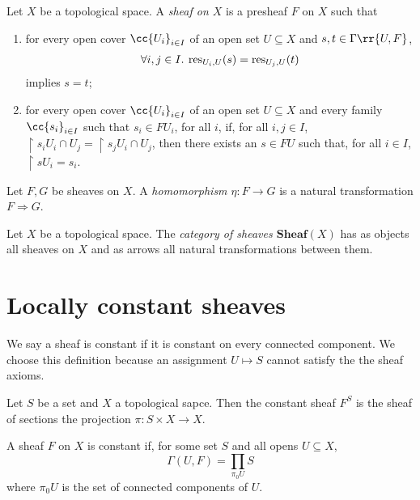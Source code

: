\documentclass{article}
\begin{document}
\begin{definition}
  Let $X$ be a topological space. A \emph{sheaf on $X$} is a presheaf $F$ on $X$
  such that
  \begin{enumerate}
    \item for every open cover $\cc{U_i}_{i\in I}$ of an open set $U\subseteq X$ and
      $s,t\in\Gamma\rr{U,F}$,
      \begin{align*}
        \forall i,j\in I.\: \operatorname{res}_{U_i,U}(s) = \operatorname{res}_{U_j,U}(t)
      \end{align*}
      implies $s=t$;
    \item for every open cover $\cc{U_i}_{i\in I}$ of an open set $U\subseteq X$
      and every family $\cc{s_i}_{i\in I}$ such that $s_i\in FU_i$, for all $i$,
      if, for all $i,j\in I$, $\restriction{s_i}{U_i\cap U_j} = \restriction{s_j}{U_i\cap U_j}$,
      then there exists an $s\in FU$ such that, for all $i\in I$,
      $\restriction{s}{U_i}=s_i$.
  \end{enumerate}
\end{definition}

\begin{definition}
  Let $F,G$ be sheaves on $X$. A \emph{homomorphism $\eta:F\to G$} is
  a natural transformation $F\Rightarrow G$.
\end{definition}

\begin{definition}
  Let $X$ be a topological space. The \emph{category of sheaves $\textbf{Sheaf}(X)$}
  has as objects all sheaves on $X$ and as arrows all natural transformations between
  them.
\end{definition}

\section{Locally constant sheaves}\label{sec:locally_constant_sheaves}

We say a sheaf is constant if it is constant on every connected component. We choose this
definition because an assignment $U\mapsto S$ cannot satisfy the the sheaf axioms.

\begin{definition}
  Let $S$ be a set and $X$ a topological sapce. Then
  the constant sheaf $F^S$ is the sheaf of sections
  the projection $\pi:S\times X\to X$.
\end{definition}


\begin{definition}
  A sheaf $F$ on $X$ is constant if, for some set $S$ and all opens $U\subseteq X$,
  \begin{equation}
    \Gamma(U,F) = \prod_{\pi_0U}S
  \end{equation}
  where $\pi_0U$ is the set of connected components of $U$.
\end{definition}
\end{document}
